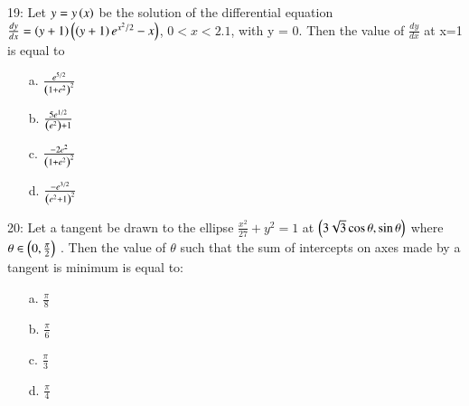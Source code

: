 \documentclass[journal,12pt,twocolumn]{IEEEtran}
\theoremstyle{remark}
\begin{document}
19: Let $y=y\left(x\right)$ be the solution of the differential equation $\frac{dy}{dx} =\left(y+1\right)\left(\left(y+1\right)e^{x^2/2}-x\right)$, $0<x<2.1$, with y = 0. Then the value of $\frac{dy}{dx}$ at x=1 is equal to
\begin{multicols}{2}
\begin{enumerate}
    \item [a.] $\frac{e^{5/2}}{\left(1+e^2\right)^2}$
    \item [b.] $\frac{5e^{1/2}}{\left(e^2\right)+1}$
	    \columnbreak
    \item [c.] $\frac{-2e^2}{\left(1+e^2\right)^2}$
    \item [d.] $\frac{-e^{3/2}}{\left(e^2+1\right)^2}$
\end{enumerate}
\end{multicols}
20: Let a tangent be drawn to the ellipse $ \frac{x^2}{27} + y^2 = 1 $ at $ \left(3\sqrt{3} \cos \theta, \sin \theta\right)$ where $\theta \in \left(0, \frac{\pi}{2}\right)$ . Then the value of $\theta$  such that the sum of intercepts on axes made by a tangent is minimum is equal to:
\begin{enumerate}
    \item [a.] $\frac{\pi}{8}$
    \item [b.]  $\frac{\pi}{6}$
    \item [c.]  $\frac{\pi}{3}$
    \item [d.]  $\frac{\pi}{4}$
\end{enumerate}
\end{document}
